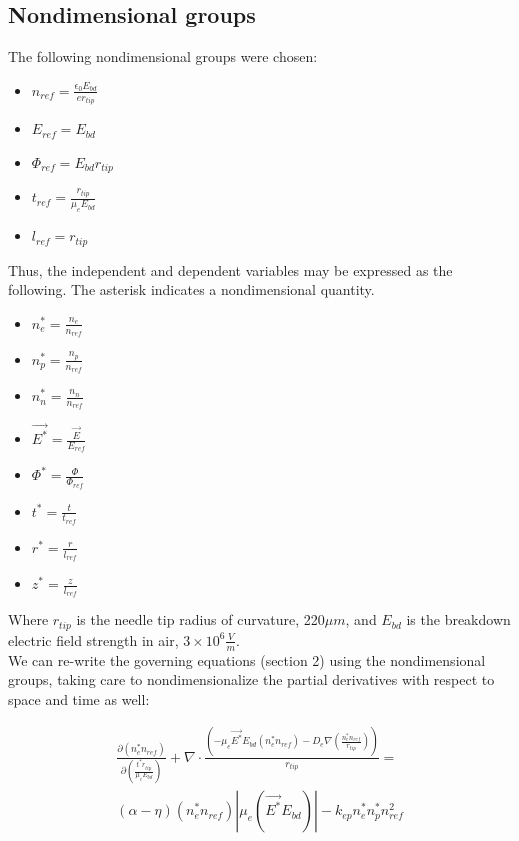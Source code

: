 \documentclass[12pt, a4paper]{report}
\begin{document}
\subsection{Nondimensional groups}
The following nondimensional groups were chosen:

\begin{itemize}
    \item $n_{ref} = \frac{\epsilon_0 E_{bd}}{e r_{tip}}$
    \item $E_{ref} = E_{bd}$
    \item $\Phi_{ref} = E_{bd}r_{tip}$
    \item $t_{ref} = \frac{r_{tip}}{\mu_e E_{bd}}$
    \item $l_{ref} = r_{tip}$
\end{itemize}

\noindent
Thus, the independent and dependent variables may be expressed as the following. The asterisk indicates a nondimensional quantity.

\begin{itemize}
    \item $n_e^* = \frac{n_e}{n_{ref}}$
    \item $n_p^* = \frac{n_p}{n_{ref}}$
    \item $n_n^* = \frac{n_n}{n_{ref}}$
    \item $\vec{E^*} = \frac{\vec{E}}{E_{ref}}$
    \item $\Phi^* = \frac{\Phi}{\Phi_{ref}}$
    \item $t^* = \frac{t}{t_{ref}}$
    \item $r^* = \frac{r}{l_{ref}}$
    \item $z^* = \frac{z}{l_{ref}}$
\end{itemize}

\noindent
Where $r_{tip}$ is the needle tip radius of curvature, 220$\mu m$, and $E_{bd}$ is the breakdown electric field strength in air, $3\times10^6 \frac{V}{m}$.\\

\noindent
We can re-write the governing equations (section 2) using the nondimensional groups, taking care to nondimensionalize the partial derivatives with respect to space and time as well:

\begin{align*}
        \frac{\partial (n_e^* n_{ref})}{\partial \left(\frac{t^*r_{tip}}{\mu_e E_{bd}}  \right)} + \nabla \cdot\frac{\left( -\mu_e\vec{E^*}E_{bd}(n_e^*n_{ref}) - D_e\nabla \left(\frac{n_e^* n_{ref}}{r_{tip}}  \right) \right)}{r_{tip}} = \\ (\alpha - \eta) (n_e^*n_{ref})|\mu_e(\vec{E^*}E_{bd})| - k_{ep}n_e^*n_p^*n_{ref}^2
\end{align*}
\end{document}
